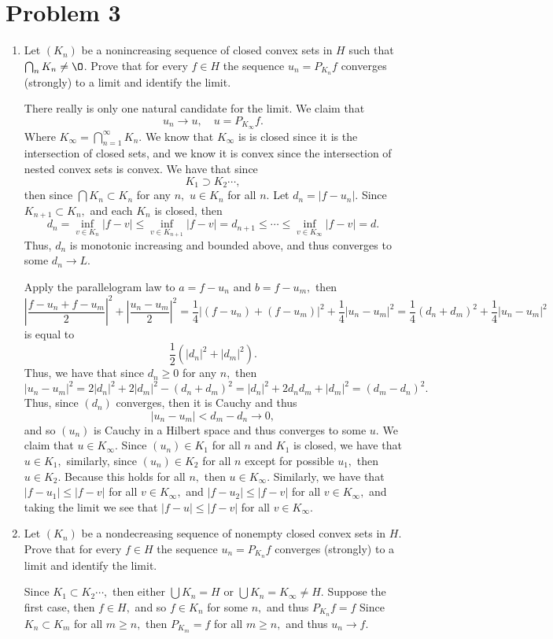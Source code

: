 \documentclass[11pt]{article}
\renewcommand{\emptyset}{\O}
\begin{document}
\section*{Problem 3}
\begin{problem}
\begin{enumerate}
    \item Let \( (K_n) \) be a nonincreasing sequence of closed convex sets in \( H \) such that \( \bigcap_n K_n \neq \emptyset \).
   Prove that for every \( f \in H \) the sequence \( u_n = P_{K_n} f \) converges (strongly) to a limit and identify the limit.
   \begin{solution}
       There really is only one natural candidate for the limit. We claim that 
       \[u_n \to u, \quad u = P_{K_\infty}f.\] Where $K_\infty = \bigcap_{n=1}^\infty K_n.$ We know that $K_\infty$ is is closed since it is the intersection of closed sets, and we know it is convex since the intersection of nested convex sets is convex. We have that since 
       \[K_1 \supset K_2 \cdots,\] then since $\bigcap K_n \subset K_n$ for any $n,$ $u\in K_n$ for all $n.$ Let $d_n = |f - u_n|.$ Since $K_{n+1}\subset K_n,$ and each $K_n$ is closed, then
       \[d_n = \inf_{v\in K_n} |f-v| \leq \inf_{v\in K_{n+1}}|f-v|= d_{n+1} \leq \cdots \leq \inf_{v\in K_\infty}|f-v| = d.\] Thus, $d_n$ is monotonic increasing and bounded above, and thus converges to some $d_n \to L.$
       
       
       Apply the parallelogram law to $a = f-u_n$ and $b = f - u_m,$ then 
       \[\left|\frac{f-u_n + f - u_m}{2}\right|^2 + \left|\frac{u_n - u_m}{2}\right|^2 = \frac{1}{4}|(f - u_n) + (f-u_m)|^2 + \frac{1}{4}|u_n - u_m|^2 = \frac{1}{4}(d_n + d_m)^2 +\frac{1}{4}|u_n - u_m|^2\] is equal to 
       \[\frac{1}{2}(|d_n|^2 + |d_m|^2).\] Thus, we have that since $d_n \geq 0$ for any $n,$ then 
       \[|u_n - u_m|^2  = 2|d_n|^2 + 2|d_m|^2 - (d_n + d_m)^2 = |d_n|^2 + 2d_nd_m + |d_m|^2  = (d_m -d_n)^2.\] Thus, since $(d_n)$ converges, then it is Cauchy and thus
       \[|u_n - u_m| < d_m - d_n \to 0,\]
       and so $(u_n)$ is Cauchy in a Hilbert space and thus converges to some $u$. We claim that $u\in K_\infty.$ Since $(u_n)\in K_1$ for all $n$ and $K_1$ is closed, we have that $u\in K_1,$ similarly, since $(u_n)\in K_2$ for all $n$ except for possible $u_1,$ then $u\in K_2.$ Because this holds for all $n,$ then $u\in K_\infty.$ Similarly, we have that $|f-u_1|\leq |f-v|$ for all $v\in K_\infty,$ and $|f-u_2| \leq |f-v|$ for all $v\in K_\infty,$ and taking the limit we see that $|f-u|\leq |f-v|$ for all $v\in K_\infty.$
   \end{solution}
   \item Let \( (K_n) \) be a nondecreasing sequence of nonempty closed convex sets in \( H \).
   Prove that for every \( f \in H \) the sequence \( u_n = P_{K_n} f \) converges (strongly) to a limit and identify the limit.
   \begin{solution}
       Since $K_1 \subset K_2 \cdots,$ then either $\bigcup K_n = H$ or $\bigcup K_n = K_\infty \neq H.$ Suppose the first case, then $f\in H,$ and so $f\in K_n$ for some $n,$ and thus $P_{K_n}f = f$ Since $K_n \subset K_m$ for all $m\geq n,$ then $P_{K_m} = f$ for all $m \geq n,$ and thus $u_n \to f.$ 


\end{solution}
\end{enumerate}
\end{problem}
\end{document}
